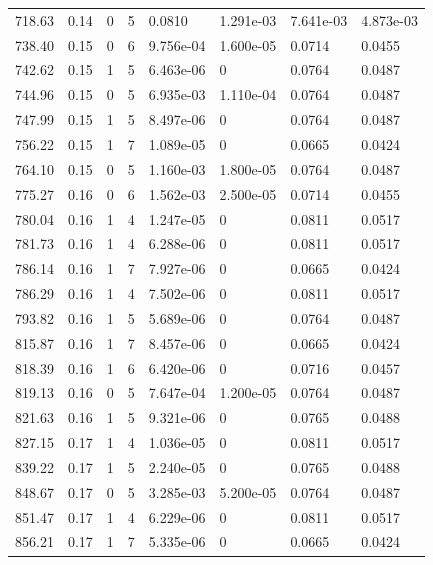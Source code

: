\documentclass[preview]{standalone}
\begin{document}
{{{\begin{tabular}{L{1.2cm}C{1.2cm} C{0.3cm}C{0.5cm} C{1.4cm}C{1.4cm} C{1.4cm}C{1.4cm}}
  718.63  &  0.14  & 0     &  5 &  0.0810  & 1.291e-03  & 7.641e-03 &  4.873e-03   \\ 
  738.40  &  0.15  & 0     &  6 &  9.756e-04  & 1.600e-05  & 0.0714 &  0.0455   \\ 
  742.62  &  0.15  & 1     &  5 &  6.463e-06  & 0  & 0.0764 &  0.0487   \\ 
  744.96  &  0.15  & 0     &  5 &  6.935e-03  & 1.110e-04  & 0.0764 &  0.0487   \\ 
  747.99  &  0.15  & 1     &  5 &  8.497e-06  & 0  & 0.0764 &  0.0487   \\ 
  756.22  &  0.15  & 1     &  7 &  1.089e-05  & 0  & 0.0665 &  0.0424   \\ 
  764.10  &  0.15  & 0     &  5 &  1.160e-03  & 1.800e-05  & 0.0764 &  0.0487   \\ 
  775.27  &  0.16  & 0     &  6 &  1.562e-03  & 2.500e-05  & 0.0714 &  0.0455   \\ 
  780.04  &  0.16  & 1     &  4 &  1.247e-05  & 0  & 0.0811 &  0.0517   \\ 
  781.73  &  0.16  & 1     &  4 &  6.288e-06  & 0  & 0.0811 &  0.0517   \\ 
  786.14  &  0.16  & 1     &  7 &  7.927e-06  & 0  & 0.0665 &  0.0424   \\ 
  786.29  &  0.16  & 1     &  4 &  7.502e-06  & 0  & 0.0811 &  0.0517   \\ 
  793.82  &  0.16  & 1     &  5 &  5.689e-06  & 0  & 0.0764 &  0.0487   \\ 
  815.87  &  0.16  & 1     &  7 &  8.457e-06  & 0  & 0.0665 &  0.0424   \\ 
  818.39  &  0.16  & 1     &  6 &  6.420e-06  & 0  & 0.0716 &  0.0457   \\ 
  819.13  &  0.16  & 0     &  5 &  7.647e-04  & 1.200e-05  & 0.0764 &  0.0487   \\ 
  821.63  &  0.16  & 1     &  5 &  9.321e-06  & 0  & 0.0765 &  0.0488   \\ 
  827.15  &  0.17  & 1     &  4 &  1.036e-05  & 0  & 0.0811 &  0.0517   \\ 
  839.22  &  0.17  & 1     &  5 &  2.240e-05  & 0  & 0.0765 &  0.0488   \\ 
  848.67  &  0.17  & 0     &  5 &  3.285e-03  & 5.200e-05  & 0.0764 &  0.0487   \\ 
  851.47  &  0.17  & 1     &  4 &  6.229e-06  & 0  & 0.0811 &  0.0517   \\ 
  856.21  &  0.17  & 1     &  7 &  5.335e-06  & 0  & 0.0665 &  0.0424   \\ 

\end{tabular}}}}
\end{document}

